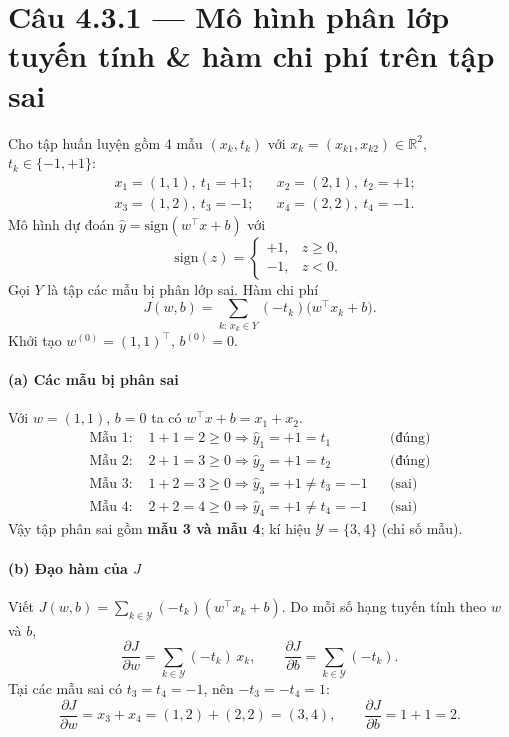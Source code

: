 \section*{Câu 4.3.1 --- Mô hình phân lớp tuyến tính \& hàm chi phí trên tập sai}

Cho tập huấn luyện gồm 4 mẫu $(x_k,t_k)$ với $x_k=(x_{k1},x_{k2})\in\mathbb{R}^2$, $t_k\in\{-1,+1\}$:
\[
\begin{aligned}
&x_1=(1,1),\ t_1=+1; &&x_2=(2,1),\ t_2=+1;\\
&x_3=(1,2),\ t_3=-1; &&x_4=(2,2),\ t_4=-1.
\end{aligned}
\]
Mô hình dự đoán $\hat y=\mathrm{sign}(w^\top x+b)$ với
\[
\mathrm{sign}(z)=\begin{cases}+1,& z\ge 0,\\ -1,& z<0.\end{cases}
\]
Gọi $Y$ là tập các mẫu bị phân lớp sai. Hàm chi phí
\[
J(w,b)=\sum_{k:\, x_k\in Y}(-t_k)\bigl(w^\top x_k+b\bigr).
\]
Khởi tạo $w^{(0)}=(1,1)^\top$, $b^{(0)}=0$.

\paragraph{(a) Các mẫu bị phân sai}
Với $w=(1,1)$, $b=0$ ta có $w^\top x+b=x_1+x_2$.
\begin{align*}
\text{Mẫu 1: }&1+1=2\ge 0 \Rightarrow \hat y_1=+1=t_1 &&\text{(đúng)}\\
\text{Mẫu 2: }&2+1=3\ge 0 \Rightarrow \hat y_2=+1=t_2 &&\text{(đúng)}\\
\text{Mẫu 3: }&1+2=3\ge 0 \Rightarrow \hat y_3=+1\neq t_3=-1 &&\text{(sai)}\\
\text{Mẫu 4: }&2+2=4\ge 0 \Rightarrow \hat y_4=+1\neq t_4=-1 &&\text{(sai)}
\end{align*}
Vậy tập phân sai gồm \textbf{mẫu 3 và mẫu 4}; kí hiệu $\mathcal Y=\{3,4\}$ (chỉ số mẫu).

\paragraph{(b) Đạo hàm của $J$}
Viết $J(w,b)=\sum_{k\in\mathcal Y}(-t_k)(w^\top x_k+b)$. Do mỗi số hạng tuyến tính theo $w$ và $b$,
\[
\frac{\partial J}{\partial w}=\sum_{k\in\mathcal Y}(-t_k)\,x_k,\qquad
\frac{\partial J}{\partial b}=\sum_{k\in\mathcal Y}(-t_k).
\]
Tại các mẫu sai có $t_3=t_4=-1$, nên $-t_3=-t_4=1$:
\[
\frac{\partial J}{\partial w}=x_3+x_4=(1,2)+(2,2)=(3,4),\qquad
\frac{\partial J}{\partial b}=1+1=2.
\]

